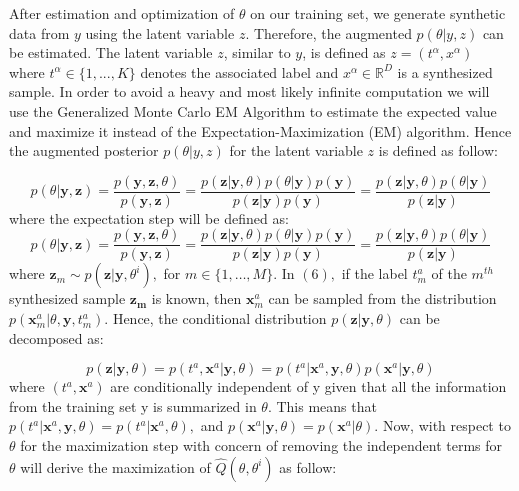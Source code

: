 After estimation and optimization of $\theta$ on our training set, we generate
synthetic data from $y$ using the latent variable $z$. Therefore, the augmented $p(\theta | y,z)$ can be
estimated. The latent variable $z$, similar to $y$, is defined as $z = (t^{\alpha}, x^{\alpha})$ where
$t^{\alpha} \in \{1,...,K\}$ denotes the associated label and $x^{\alpha} \in   \mathbb{R}^D$ is a
synthesized sample. In order to avoid a heavy and most likely infinite computation we will use the Generalized Monte Carlo EM
Algorithm to estimate the expected value and maximize it instead of the Expectation-Maximization
(EM) algorithm. Hence the augmented posterior $p(\theta|y,
  z)$ for the latent variable $z$ is defined as follow:

\begin{equation} \label{eq:latent-variable}
  p(\theta | \mathbf{y}, \mathbf{z})=\frac{p(\mathbf{y}, \mathbf{z}, \theta)}{p(\mathbf{y}, \mathbf{z})}=\frac{p(\mathbf{z} | \mathbf{y}, \theta) p(\theta | \mathbf{y}) p(\mathbf{y})}{p(\mathbf{z} | \mathbf{y}) p(\mathbf{y})}=\frac{p(\mathbf{z} | \mathbf{y}, \theta) p(\theta | \mathbf{y})}{p(\mathbf{z} | \mathbf{y})}
\end{equation}
where the expectation step will be defined as:
\begin{equation} \label{eq:expectation-latent-variable}
  p(\theta | \mathbf{y}, \mathbf{z})=\frac{p(\mathbf{y}, \mathbf{z}, \theta)}{p(\mathbf{y}, \mathbf{z})}=\frac{p(\mathbf{z} | \mathbf{y}, \theta) p(\theta | \mathbf{y}) p(\mathbf{y})}{p(\mathbf{z} | \mathbf{y}) p(\mathbf{y})}=\frac{p(\mathbf{z} | \mathbf{y}, \theta) p(\theta | \mathbf{y})}{p(\mathbf{z} | \mathbf{y})}
\end{equation}
where \(\mathbf{z}_{m} \sim p\left(\mathbf{z} | \mathbf{y}, \theta^{i}\right),\) for \(m \in\{1,
\ldots, M\} .\) In \((6),\) if the label \(t_{m}^{a}\) of the \(m^{t h}\) synthesized sample
\(\mathbf{z}_{\mathbf{m}}\) is known, then \(\mathbf{x}_{m}^{a}\) can be sampled from the
distribution \(p\left(\mathbf{x}_{m}^{a} | \theta, \mathbf{y}, t_{m}^{a}\right) .\) Hence, the
conditional distribution \(p(\mathbf{z} | \mathbf{y}, \theta)\) can be decomposed as:

\begin{equation}
  p(\mathbf{z} | \mathbf{y}, \theta)=p\left(t^{a}, \mathbf{x}^{a} | \mathbf{y}, \theta\right)=p\left(t^{a} | \mathbf{x}^{a}, \mathbf{y}, \theta\right) p\left(\mathbf{x}^{a} | \mathbf{y}, \theta\right)
\end{equation}
where \(\left(t^{a}, \mathbf{x}^{a}\right)\) are conditionally independent of y given that all the
information from the training set y is summarized in \(\theta\). This means that \(p\left(t^{a} |
\mathbf{x}^{a}, \mathbf{y}, \theta\right)=p\left(t^{a} | \mathbf{x}^{a}, \theta\right),\) and
\(p\left(\mathbf{x}^{a} | \mathbf{y}, \theta\right)=p\left(\mathbf{x}^{a} | \theta\right)\).
Now, with respect to $\theta$ for the maximization step with concern of removing the independent terms
for $\theta$ will derive the maximization of $\hat{Q}\left(\theta, \theta^{i}\right)$ as follow:

